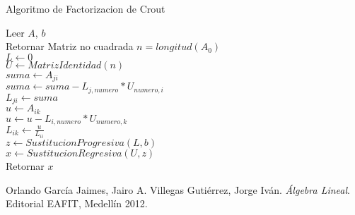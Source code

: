 \documentclass[12pt]{article}
\begin{document}
        \begin{algorithm}[H]
            \caption{Algoritmo de Factorizacion de Crout}
            Leer $A$, $b$\\
            {
                Retornar Matriz no cuadrada
            }
            {
                $n = longitud(A_{0})$\\ 
                $L \leftarrow 0$\\
                $U \leftarrow MatrizIdentidad(n)$\\
                {
                    {
                        $suma \leftarrow A_{ji}$\\
                        {
                            $suma \leftarrow suma - L_{j, numero} * U_{numero, i}$\\
                        }
                        $L_{ji} \leftarrow suma$\\
                    }
                    {
                        $u \leftarrow A_{ik}$\\
                        {
                            $u \leftarrow u - L_{i, numero} * U_{numero, k}$\\
                        }
                        $L_{ik} \leftarrow \frac{u}{L_{ii}}$\\
                    }
                }
                $z \leftarrow SustitucionProgresiva(L, b)$\\
                $x \leftarrow SustitucionRegresiva(U, z)$\\
                Retornar $x$
            }

        \end{algorithm}

    
        \begin{thebibliography}{9}
            Orlando García Jaimes, Jairo A. Villegas Gutiérrez, Jorge Iván. \textit{Álgebra Lineal}. Editorial EAFIT, Medellín 2012. 
        \end{thebibliography}
    
\end{document}
